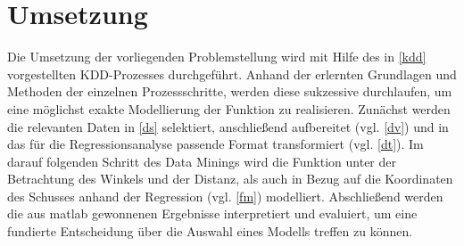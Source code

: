 \chapter{Umsetzung}
\label{umsetzung}

Die Umsetzung der vorliegenden Problemstellung wird mit Hilfe des in \vref{kdd} vorgestellten KDD-Prozesses durchgeführt. Anhand der erlernten Grundlagen und Methoden der einzelnen Prozessschritte, werden diese sukzessive durchlaufen, um eine möglichst exakte Modellierung der Funktion zu realisieren. Zunächst werden die relevanten Daten in \vref{ds} selektiert, anschließend aufbereitet (vgl. \vref{dv}) und in das für die Regressionsanalyse passende Format transformiert (vgl. \vref{dt}). Im darauf folgenden Schritt des Data Minings wird die Funktion unter der Betrachtung des Winkels und der Distanz, als auch in Bezug auf die Koordinaten des Schusses anhand der Regression (vgl. \vref{fm}) modelliert. Abschließend werden die aus \gls{matlab} gewonnenen Ergebnisse interpretiert und evaluiert, um eine fundierte Entscheidung über die Auswahl eines Modells treffen zu können.





